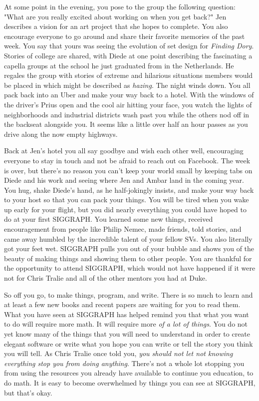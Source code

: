 \documentclass[../main.tex]{subfiles}
\begin{document}
At some point in the evening, you pose to the group the following question: "What are you really excited about working on when you get back?" Jen describes a vision for an art project that she hopes to complete. You also encourage everyone to go around and share their favorite memories of the past week. You say that yours was seeing the evolution of set design for \textit{Finding Dory}. Stories of college are shared, with Diede at one point describing the fascinating a capella groups at the school he just graduated from in the Netherlands. He regales the group with stories of extreme and hilarious situations members would be placed in which might be described as \textit{hazing}. The night winds down. You all pack back into an Uber and make your way back to a hotel. With the windows of the driver's Prius open and the cool air hitting your face, you watch the lights of neighborhoods and industrial districts wash past you while the others nod off in the backseat alongside you. It seems like a little over half an hour passes as you drive along the now empty highways.

Back at Jen's hotel you all say goodbye and wish each other well, encouraging everyone to stay in touch and not be afraid to reach out on Facebook. The week is over, but there's no reason you can't keep your world small by keeping tabs on Diede and his work and seeing where Jen and Ambar land in the coming year. You hug, shake Diede's hand, as he half-jokingly insists, and make your way back to your host so that you can pack your things. You will be tired when you wake up early for your flight,  but you did nearly everything you could have hoped to do at your first SIGGRAPH. You learned some new things, received encouragement from people like Philip Nemec, made friends, told stories, and came away humbled by the incredible talent of your fellow SVs. You also literally got your feet wet. SIGGRAPH pulls you out of your bubble and shows you of the beauty of making things and showing them to other people.  You are thankful for the opportunity to attend SIGGRAPH, which would not have happened if it were not for Chris Tralie and all of the other mentors you had at Duke.

So off you go, to make things, program, and write. There is so much to learn and at least a few new books and recent papers are waiting for you to read them. What you have seen at SIGGRAPH has helped remind you that what you want to do will require more math. It will require more \textit{of a lot of things}. You do not yet know many of the things that you will need to understand in order to create elegant software or write what you hope you can write or tell the story you think you will tell. As Chris Tralie once told you, \textit{you should not let not knowing everything stop you from doing anything}. There's not a whole lot stopping you from using the resources you already have available to continue you education, to do math. It is easy to become overwhelmed by things you can see at SIGGRAPH, but that's okay.
\end{document}
